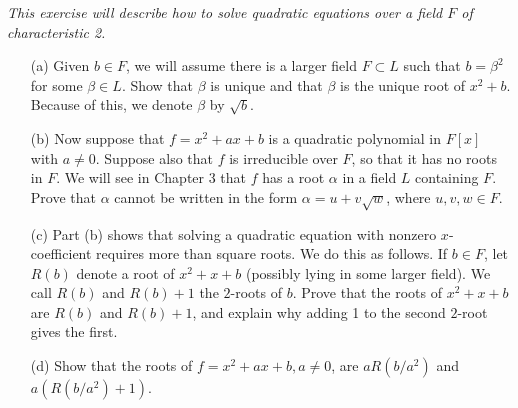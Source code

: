 \documentclass[11pt,a4paper]{article}
\begin{document}
{\it This exercise will describe how to solve quadratic equations over a field $F$ of characteristic 2.
\begin{enumerate}
\item[(a)] Given $b \in F$, we will assume there is a larger field $F\subset L$ such that $b=\beta^2$ for some $\beta \in L$.
Show that $\beta$ is unique and that $\beta$ is the unique root of $x^2+b$. Because of this, we denote $\beta$ by $\sqrt{b}$.
\item[(b)] Now suppose that $f = x^2+ax+b$ is a quadratic polynomial in $F[x]$ with $a\ne 0$. Suppose also that $f$ is irreducible over $F$, so that it has no roots in $F$. We will see in Chapter 3 that $f$ has a root $\alpha$ in a field $L$ containing $F$. Prove that $\alpha$ cannot be written in the form $\alpha = u + v \sqrt{w}$, where $u,v,w \in F$.
\item[(c)] Part (b) shows that solving a quadratic equation with nonzero $x$-coefficient requires more than square roots. We do this as follows. If $b\in F$, let $R(b)$ denote a root of $x^2+x+b$ (possibly lying in some larger field). We call $R(b)$ and $R(b)+1$ the $2$-roots of $b$. Prove that the roots of $x^2+x+b$ are $R(b)$ and $R(b)+1$, and explain why adding 1 to the second $2$-root gives the first. 
\item[(d)] Show that the roots of $f = x^2 + ax+b, a\ne 0$, are $aR(b/a^2)$ and $a(R(b/a^2)+1)$.
\end{enumerate}
}
\end{document}
